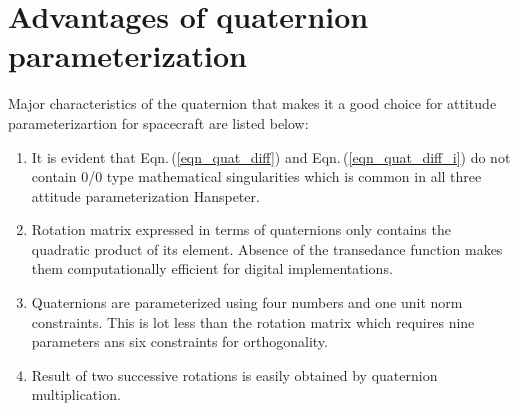 \documentclass[12pt]{article}
\begin{document}
\section{Advantages of quaternion parameterization}
\label{subsection:quaternion_advantages}
Major characteristics of the quaternion that makes it a good choice for attitude parameterizartion for spacecraft are listed below:

\begin{enumerate}
\item It is evident that Eqn.\,(\ref{eqn_quat_diff}) and Eqn.\,(\ref{eqn_quat_diff_i}) do not contain 0/0 type mathematical singularities which is common in all three attitude parameterization Hanspeter.

\item Rotation matrix expressed in terms of quaternions only contains the quadratic product of its element. Absence of the transedance function makes them computationally efficient for digital implementations.

\item Quaternions are parameterized using four numbers and one unit norm constraints. This is lot less than the rotation matrix which requires nine parameters ans six constraints for orthogonality.  

\item Result of two successive rotations is easily obtained by quaternion multiplication.
\end{enumerate}

\newpage


\end{document}
